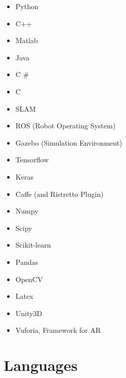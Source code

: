 \documentclass[11pt,a4paper,sans]{moderncv} %
\begin{document}
{
\begin{itemize}
\item Python
\item C++
\item Matlab
\item Java
\item C \#
\item C
\end{itemize}
}
{
\begin{itemize}
\item SLAM
\item ROS (Robot Operating System)
\item Gazebo (Simulation Environment)
\end{itemize}
}
{
\begin{itemize}
\item Tensorflow
\item Keras
\item Caffe (and Ristretto Plugin)
\end{itemize}
}
{
\begin{itemize}
\item Numpy
\item Scipy
\item Scikit-learn
\item Pandas
\item OpenCV
\item Latex
\item Unity3D
\item Vuforia, Framework for AR
\end{itemize}
}




\section{Languages}

\end{document}
